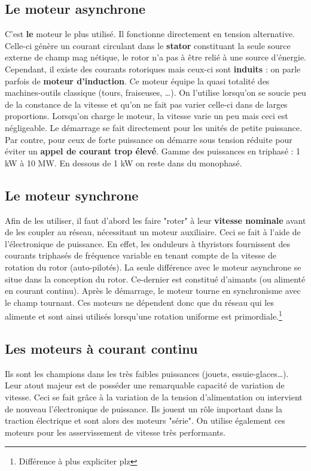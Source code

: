 	\subsection{Le moteur asynchrone}
	C'est \textbf{le} moteur le plus utilisé. Il fonctionne directement 
	en tension alternative. Celle-ci génère un courant circulant dans le 
	\textbf{stator} constituant la seule source externe de champ mag
	nétique, le 
	rotor n'a pas à être relié à une source d'énergie. Cependant, il existe 
	des courants rotoriques mais ceux-ci sont \textbf{induits} : on parle 
	parfois de \textbf{moteur d'induction}. Ce moteur équipe la quasi 
	totalité des machines-outils classique (tours, fraiseuses, \dots).
	On l'utilise lorsqu'on se soucie peu de la constance de la vitesse et qu'on ne fait
	 pas varier celle-ci dans de larges proportions. Lorsqu'on charge le moteur, la
	 vitesse varie un peu mais ceci est négligeable. Le démarrage se fait
	 directement	  
	 pour les unités de petite puissance. Par contre, pour ceux de forte puissance on
	 démarre sous tension réduite pour éviter un \textbf{appel de courant trop
	 élevé}.
	 Gamme des puissances en triphasé : 1 kW à 10 MW. En dessous de 1 kW on
	 reste dans du monophasé. 
	 
	
	\subsection{Le moteur synchrone}
	Afin de les utiliser, il faut d'abord les faire "roter" à leur 
	\textbf{vitesse nominale} avant de les coupler au réseau, nécessitant un 
	moteur auxiliaire. Ceci se fait à l'aide de l'électronique de puissance. En effet, les
	onduleurs à thyristors fournissent des courants triphasés de fréquence variable
	en tenant compte de la vitesse de rotation du rotor (auto-pilotés). La seule
	différence avec le moteur asynchrone 
	se situe dans la conception du rotor. Ce-dernier est constitué 
	d'aimants (ou alimenté en courant continu). Après le démarrage, le 
	moteur tourne en synchronisme avec le champ tournant. Ces moteurs 
	ne dépendent donc que du réseau qui les alimente et sont ainsi 
	utilisés lorsqu'une rotation uniforme est primordiale.\footnote{
	Différence à plus expliciter plz}
	
	
	\subsection{Les moteurs à courant continu}
	Ils sont les champions dans les très faibles puissances (jouets, 
	essuie-glaces\dots). Leur atout majeur est de posséder une 
	remarquable capacité de variation de vitesse. Ceci se fait grâce à la variation de
	la tension d'alimentation ou intervient de nouveau l'électronique de puissance. Ils
	jouent un rôle 
	important dans la traction électrique et sont alors des
	moteurs "série". On utilise également ces moteurs pour les asservissement de vitesse très performants. 
	
